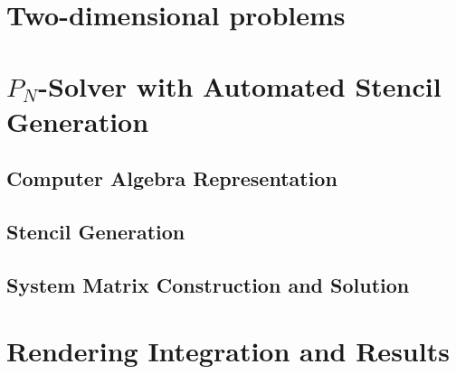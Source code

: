 

\section{Two-dimensional problems}
\label{sec:pn_2d}
\section{$P_N$-Solver with Automated Stencil Generation}
\label{sec:pn_solver}
\subsection{Computer Algebra Representation}
\label{sec:pn_car}
\subsection{Stencil Generation}
\subsection{System Matrix Construction and Solution}
\section{Rendering Integration and Results}
\label{sec:pn_results}
